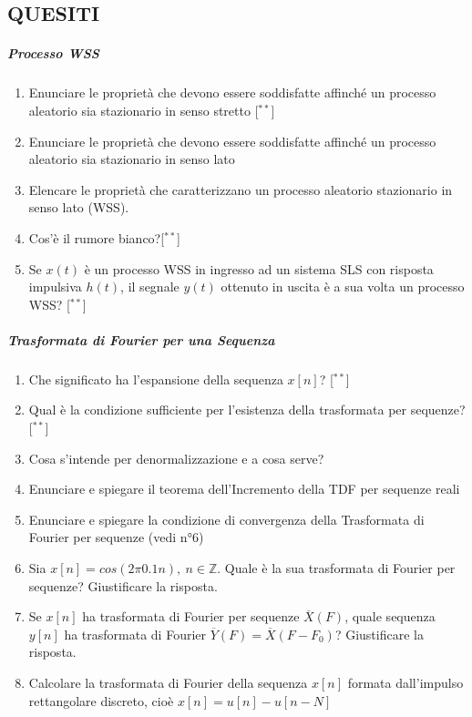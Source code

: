 \documentclass[
]{article}
\author{}
\date{}
\providecommand{\tightlist}{%
  \setlength{\itemsep}{0pt}\setlength{\parskip}{0pt}}
\begin{document}
\subsection{QUESITI}\label{quesiti}

\subparagraph{Processo WSS}\label{processo-wss}

\begin{enumerate}
\def\labelenumi{\arabic{enumi}.}
\tightlist
\item
  Enunciare le proprietà che devono essere soddisfatte affinché un
  processo aleatorio sia stazionario in senso stretto {[}\(^{**}\){]}
\item
  Enunciare le proprietà che devono essere soddisfatte affinché un
  processo aleatorio sia stazionario in senso lato
\item
  Elencare le proprietà che caratterizzano un processo aleatorio
  stazionario in senso lato (WSS).
\item
  Cos'è il rumore bianco?{[}\(^{**}\){]}
\item
  Se \(x(t)\) è un processo WSS in ingresso ad un sistema SLS con
  risposta impulsiva \(h(t)\), il segnale \(y(t)\) ottenuto in uscita è
  a sua volta un processo WSS? {[}\(^{**}\){]}
\end{enumerate}

\subparagraph{Trasformata di Fourier per una
Sequenza}\label{trasformata-di-fourier-per-una-sequenza}

\begin{enumerate}
\def\labelenumi{\arabic{enumi}.}
\setcounter{enumi}{5}
\tightlist
\item
  Che significato ha l'espansione della sequenza \(x[n]\)?
  {[}\(^{**}\){]}
\item
  Qual è la condizione sufficiente per l'esistenza della trasformata per
  sequenze? {[}\(^{**}\){]}
\item
  Cosa s'intende per denormalizzazione e a cosa serve?
\item
  Enunciare e spiegare il teorema dell'Incremento della TDF per sequenze
  reali
\item
  Enunciare e spiegare la condizione di convergenza della Trasformata di
  Fourier per sequenze (vedi n°6)
\item
  Sia \(x[n] = cos(2\pi 0.1 n), \ n \in \mathbb{Z}\). Quale è la sua
  trasformata di Fourier per sequenze? Giustificare la risposta.
\item
  Se \(x[n]\) ha trasformata di Fourier per sequenze
  \(\overline{X}(F)\), quale sequenza \(y[n]\) ha trasformata di Fourier
  \(\overline{Y}(F) = \overline{X}(F - F_0)\)? Giustificare la risposta.
\item
  Calcolare la trasformata di Fourier della sequenza \(x[n]\) formata
  dall'impulso rettangolare discreto, cioè \(x[n]= u[n]-u[n-N]\)
\end{enumerate}
\end{document}

